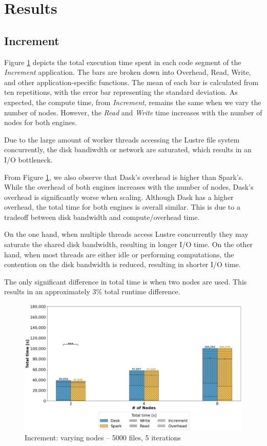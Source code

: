 \documentclass[AMA,STIX1COL]{WileyNJD-v2}
\newcommand{\HL}[1]{#1}
\begin{document}
\section{Results}
\subsection{Increment}
Figure \ref{fig:increment_worker} depicts the total execution time spent in each code segment of the \textit{Increment} application.
The bars are broken down into Overhead, Read, Write, and other application-specific functions.
The mean of each bar is calculated from ten repetitions, with the error bar representing the standard deviation.
As expected, the compute time, from \textit{Increment}, remains the same when we vary the number of nodes.
However, the \textit{Read} and \textit{Write} time increases with the number of nodes for both engines.
\HL{
	Due to the large amount of worker threads accessing the Lustre file system
	concurrently, the disk bandiwdth or network are saturated, which results in an I/O bottleneck.
}
												
From Figure \ref{fig:increment_worker}, we also observe that Dask's overhead is higher than Spark's.
While the overhead of both engines increases with the number of nodes, Dask's overhead is significantly worse when scaling.
Although Dask has a higher overhead, the total time for both engines is overall similar.
This is due to a tradeoff between disk bandwidth and compute/overhead time.
\HL{
	On the one hand, when multiple threads access Lustre concurrently they may saturate the shared disk bandwidth, resulting in longer I/O time.
	On the other hand, when most threads are either idle or performing computations,
	the contention on the disk bandwidth is reduced, resulting in shorter I/O time.
}
The only significant difference in total time is when two nodes are used.
This results in an approximately 3\% total runtime difference.
\begin{figure}[!h]
	\centering
	\includegraphics[clip,width=0.75\columnwidth]{figures/stacked_increment_worker.jpg}
	\caption{Increment: varying nodes -- 5000 files, 5 iterations}
	\label{fig:increment_worker}
\end{figure}
														
\end{document}
